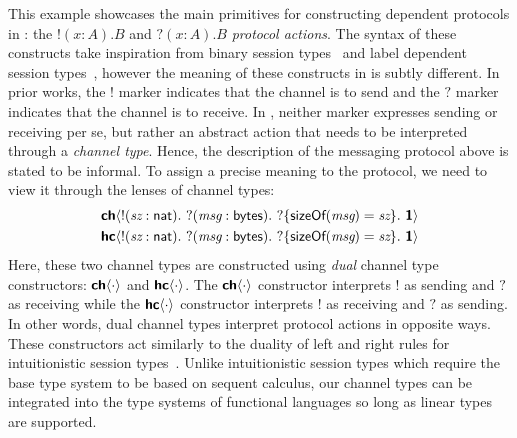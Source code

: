 This example showcases the main primitives for constructing dependent protocols in
\TLLC{}: the $!(x : A).B$ and $?(x : A).B$ \emph{protocol actions}. The syntax of these
constructs take inspiration from binary session types~\cite{gay10,wadler12} and label
dependent session types~\cite{ldst}, however the meaning of these constructs in \TLLC{} is
subtly different. In prior works, the $!$ marker indicates that the channel is to send
and the $?$ marker indicates that the channel is to receive. In \TLLC{}, neither marker
expresses sending or receiving per se, but rather an abstract action that needs to be
interpreted through a \emph{channel type}. Hence, the description of the messaging protocol
above is stated to be informal. To assign a precise meaning to the protocol, we need to
view it through the lenses of channel types:
\begin{align*}
  &\CH{!(\textit{sz}: \textsf{nat}).\ ?(\textit{msg}: \textsf{bytes}).\ ?\{\textsf{sizeOf}(\textit{msg}) = \textit{sz}\}.\ \End} \\
  &\HC{!(\textit{sz}: \textsf{nat}).\ ?(\textit{msg}: \textsf{bytes}).\ ?\{\textsf{sizeOf}(\textit{msg}) = \textit{sz}\}.\ \End}
\end{align*}
Here, these two channel types are constructed using \emph{dual} channel type
constructors: ${\textbf{\textsf{ch}}\langle{\cdot}\rangle}$ and ${\textbf{\textsf{hc}}\langle{\cdot}\rangle}$.  The ${\textbf{\textsf{ch}}\langle{\cdot}\rangle}$ constructor
interprets $!$ as sending and $?$ as receiving while the ${\textbf{\textsf{hc}}\langle{\cdot}\rangle}$
constructor interprets $!$ as receiving and $?$ as sending. In other words, dual
channel types interpret protocol actions in opposite ways. These constructors act similarly
to the duality of left and right rules for intuitionistic session types~\cite{caires10}.
Unlike intuitionistic session types which require the base type system to be
based on sequent calculus, our channel types can be integrated into the type
systems of functional languages so long as linear types are supported.


